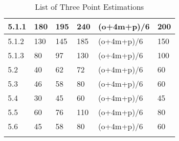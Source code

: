 \begin{longtable}[H]{C{1.5cm} C{2cm} C{2cm} C{2cm} C{3cm} C{2cm} }
		5.1.1 & 180 & 195 & 240 & (o+4m+p)/6 & 200\\ \midrule
		
		5.1.2 & 130 & 145 & 185 & (o+4m+p)/6 & 150\\ \midrule
		
		5.1.3 & 80 & 97 & 130 & (o+4m+p)/6 & 100\\ \midrule
		
		5.2 & 40 & 62 & 72 & (o+4m+p)/6 & 60\\ \midrule
		
		5.3 & 46 & 58 & 80 & (o+4m+p)/6 & 60\\ \midrule
		
		5.4 & 30 & 45 & 60 & (o+4m+p)/6 & 45\\ \midrule
		
		5.5 & 60 & 76 & 110 & (o+4m+p)/6 & 80\\ \midrule
		
		5.6 & 45 & 58 & 80 & (o+4m+p)/6 & 60\\ \midrule
		
    \bottomrule[2pt]
	\caption{List of Three Point Estimations}

\end{longtable}
	
	